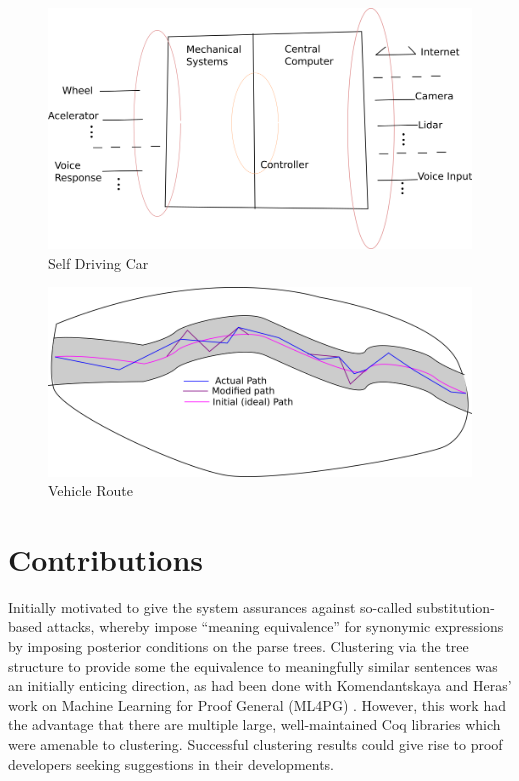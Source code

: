 \documentclass[a4paper, 11pt]{article}
\begin{document}
\begin{figure}
\centering
\includegraphics[width=150mm]{pics/selfDriving.png}
\caption{Self Driving Car}\label{fig:A1}
\end{figure}

\begin{figure}
\centering
\includegraphics[width=150mm]{pics/diagramTrial1.png}
\caption{Vehicle Route}\label{fig:A1}
\end{figure}

\section{Contributions}

Initially motivated to give the system assurances against so-called
substitution-based attacks, whereby impose ``meaning equivalence'' for synonymic
expressions by imposing posterior conditions on the parse trees. Clustering via
the tree structure to provide some the equivalence to meaningfully similar
sentences was an initially enticing direction, as had been done with
Komendantskaya and Heras' work on Machine Learning for Proof General (ML4PG)
\cite{ml4pg}. However, this work had the advantage that there are multiple
large, well-maintained Coq libraries which were amenable to clustering.
Successful clustering results could give rise to proof developers seeking
suggestions in their developments.
\end{document}
